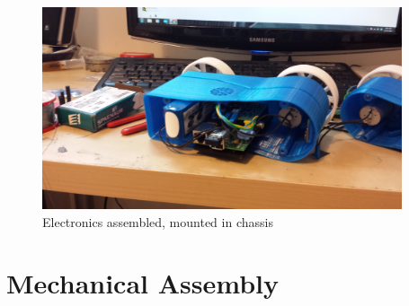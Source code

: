 \documentclass[12pt,titlepage,oneside]{memoir}
\begin{document}
\begin{figure}
\includegraphics[width=400px]{picture/side.jpg}
\caption{Electronics assembled, mounted in chassis}
\end{figure}

\section{Mechanical Assembly}
\end{document}
